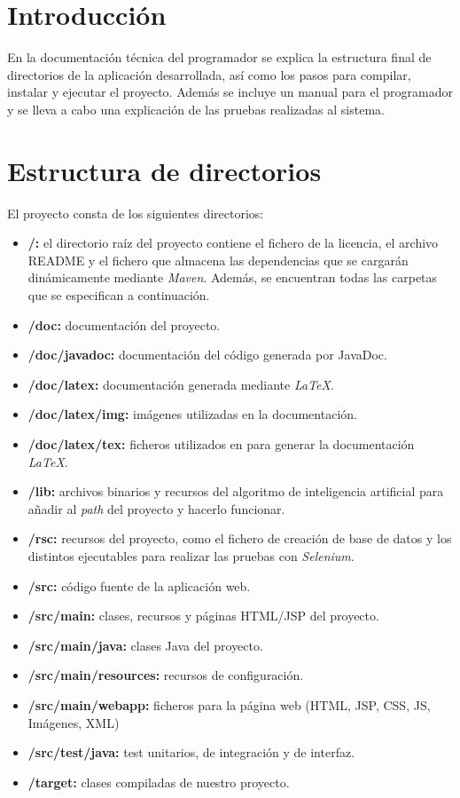 
\section{Introducción}

En la documentación técnica del programador se explica la estructura final de directorios de la aplicación desarrollada, así como los pasos para compilar, instalar y ejecutar el proyecto. Además se incluye un manual para el programador y se lleva a cabo una explicación de las pruebas realizadas al sistema.

\section{Estructura de directorios}

El proyecto consta de los siguientes directorios:

\begin{itemize}
\tightlist
\item \textbf{/:} el directorio raíz del proyecto contiene el fichero de la licencia, el archivo README y el fichero que almacena las dependencias que se cargarán dinámicamente mediante \emph{Maven}. Además, se encuentran todas las carpetas que se especifican a continuación.
\item \textbf{/doc:} documentación del proyecto.
\item \textbf{/doc/javadoc:} documentación del código generada por JavaDoc.
\item \textbf{/doc/latex:} documentación generada mediante \emph{LaTeX}.
\item \textbf{/doc/latex/img:} imágenes utilizadas en la documentación.
\item \textbf{/doc/latex/tex:} ficheros utilizados en para generar la documentación \emph{LaTeX}.
\item \textbf{/lib:} archivos binarios y recursos del algoritmo de inteligencia artificial para añadir al \emph{path} del proyecto y hacerlo funcionar.
\item \textbf{/rsc:} recursos del proyecto, como el fichero de creación de base de datos y los distintos ejecutables para realizar las pruebas con \emph{Selenium}.
\item \textbf{/src:} código fuente de la aplicación web.
\item \textbf{/src/main:} clases, recursos y páginas HTML/JSP del proyecto.
\item \textbf{/src/main/java:} clases Java del proyecto.
\item \textbf{/src/main/resources:} recursos de configuración.
\item \textbf{/src/main/webapp:} ficheros para la página web (HTML, JSP, CSS, JS, Imágenes, XML)
\item \textbf{/src/test/java: } test unitarios, de integración y de interfaz.
\item \textbf{/target:} clases compiladas de nuestro proyecto.
\end{itemize}


